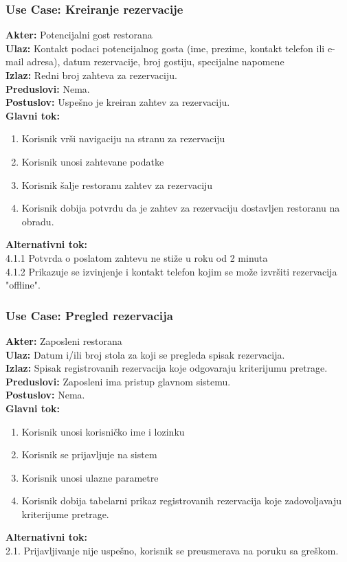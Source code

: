 \documentclass{article}
\begin{document}
\subsubsection{\textbf{Use Case}: Kreiranje rezervacije}
\textbf{Akter:} Potencijalni gost restorana\\
\textbf{Ulaz:} Kontakt podaci potencijalnog gosta (ime, prezime, kontakt telefon ili e-mail adresa), datum rezervacije, broj gostiju, specijalne napomene\\
\textbf{Izlaz:} Redni broj zahteva za rezervaciju.\\
\textbf{Preduslovi:} Nema.\\
\textbf{Postuslov:} Uspešno je kreiran zahtev za rezervaciju.\\
\textbf{Glavni tok:}
\begin{enumerate}
\item Korisnik vrši navigaciju na stranu za rezervaciju
\item Korisnik unosi zahtevane podatke
\item Korisnik šalje restoranu zahtev za rezervaciju
\item Korisnik dobija potvrdu da je zahtev za rezervaciju dostavljen restoranu na obradu.\\
\end{enumerate}
\textbf{Alternativni tok:}\\
		4.1.1 Potvrda o poslatom zahtevu ne stiže u roku od 2 minuta\\
		4.1.2 Prikazuje se izvinjenje i kontakt telefon kojim se može izvršiti rezervacija "offline".\\

\subsubsection{\textbf{Use Case}: Pregled rezervacija}
\textbf{Akter:} Zaposleni restorana\\
\textbf{Ulaz:} Datum i/ili broj stola za koji se pregleda spisak rezervacija.\\
\textbf{Izlaz:} Spisak registrovanih rezervacija koje odgovaraju kriterijumu pretrage.\\
\textbf{Preduslovi:} Zaposleni ima pristup glavnom sistemu.\\
\textbf{Postuslov:} Nema.\\
\textbf{Glavni tok:}
\begin{enumerate}
\item Korisnik unosi korisničko ime i lozinku
\item Korisnik se prijavljuje na sistem
\item Korisnik unosi ulazne parametre
\item Korisnik dobija tabelarni prikaz registrovanih rezervacija koje zadovoljavaju kriterijume pretrage.\\
\end{enumerate}
\textbf{Alternativni tok:}\\
        2.1. Prijavljivanje nije uspešno, korisnik se preusmerava na poruku sa greškom.\\
\end{document}
